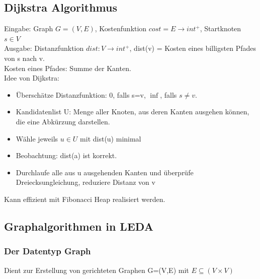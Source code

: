\documentclass[a4paper]{article}
\begin{document}
\subsection*{Dijkstra Algorithmus}
Eingabe: Graph $G=(V,E)$, Kostenfunktion $cost=E\rightarrow int^+$, Startknoten $s\in V$\\
Ausgabe: Distanzfunktion $dist:V\rightarrow int^+$, dist(v) = Kosten eines billigsten Pfades von s nach v.\\
\hspace*{1cm}Kosten eines Pfades: Summe der Kanten.\\
Idee von Dijkstra:\\
\begin{itemize}
\item Überschätze Distanzfunktion: 0, falls s=v, $\inf$, falls $s\neq v$.
\item Kandidatenlist U: Menge aller Knoten, aus deren Kanten ausgehen können, die eine Abkürzung darstellen.
\item Wähle jeweils $u\in U$ mit dist(u) minimal
\item Beobachtung: dist(a) ist korrekt.
\item Durchlaufe alle aus u ausgehenden Kanten und überprüfe Dreiecksungleichung, reduziere Distanz von v
\end{itemize}
Kann effizient mit Fibonacci Heap realisiert werden.
\subsection*{Graphalgorithmen in LEDA}
\subsubsection*{Der Datentyp Graph}
Dient zur Erstellung von gerichteten Graphen G=(V,E) mit $E \subseteq (V \times V)$\\
\end{document}
